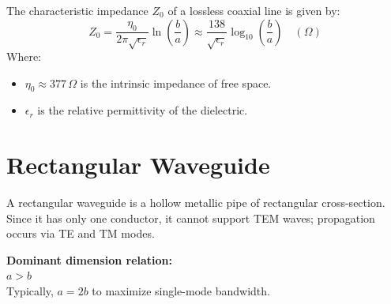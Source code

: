\documentclass[12pt,a4paper]{article}
\begin{document}
\begin{tcolorbox}[formulabox, title={\textbf{Coaxial Line Characteristic Impedance}}]
The characteristic impedance $Z_0$ of a lossless coaxial line is given by:
\begin{equation}
  Z_0 = \frac{\eta_0}{2\pi \sqrt{\epsilon_r}} \ln\left(\frac{b}{a}\right) \approx \frac{138}{\sqrt{\epsilon_r}} \log_{10}\left(\frac{b}{a}\right) \quad (\Omega)
\end{equation}
Where:
\begin{itemize}[leftmargin=1.5em, itemsep=1pt, topsep=2pt]
  \item[] $\eta_0 \approx 377\,\Omega$ is the intrinsic impedance of free space.
  \item[] $\epsilon_r$ is the relative permittivity of the dielectric.
\end{itemize}
\end{tcolorbox}

\section{Rectangular Waveguide}

A rectangular waveguide is a hollow metallic pipe of rectangular cross-section. Since it has only one conductor, it cannot support TEM waves; propagation occurs via TE and TM modes.

\begin{tcolorbox}[tikzbox, title={Rectangular Waveguide Geometry}]
\begin{minipage}[c]{0.52\linewidth}
\centering
{}
\end{minipage}\hfill
\begin{minipage}[c]{0.43\linewidth}
\raggedright
\textbf{Dominant dimension relation:}\\[3pt]
$a > b$\\[2pt]
Typically, $a = 2b$ to maximize single-mode bandwidth.
\end{minipage}
\end{tcolorbox}
\end{document}
